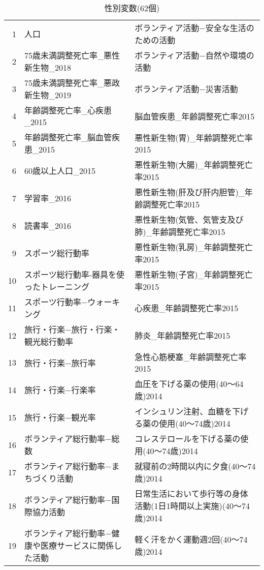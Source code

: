 \begin{table}[ht]
\centering
\caption{性別変数(62個)}
\label{table_mf_d2.tex}
\begingroup\tiny

\begin{adjustbox}{width=1\textwidth}
\begin{tabular}{rll}
  \hline
  \hline
1 & 人口 & ボランティア活動−安全な生活のための活動 \\
  2 & 75歳未満調整死亡率\_悪性新生物\_2018 & ボランティア活動−自然や環境の活動 \\
  3 & 75歳未満調整死亡率\_悪政新生物\_2019 & ボランティア活動−災害活動 \\
  4 & 年齢調整死亡率\_心疾患\_2015 & 脳血管疾患\_年齢調整死亡率2015 \\
  5 & 年齢調整死亡率\_脳血管疾患\_2015 & 悪性新生物(胃)\_年齢調整死亡率2015 \\
  6 & 60歳以上人口\_2015 & 悪性新生物(大腸)\_年齢調整死亡率2015 \\
  7 & 学習率\_2016 & 悪性新生物(肝及び肝内胆管)\_年齢調整死亡率2015 \\
  8 & 読書率\_2016 & 悪性新生物(気管、気管支及び肺)\_年齢調整死亡率2015 \\
  9 & スポーツ総行動率 & 悪性新生物(乳房)\_年齢調整死亡率2015 \\
  10 & スポーツ総行動率-器具を使ったトレーニング & 悪性新生物(子宮)\_年齢調整死亡率2015 \\
  11 & スポーツ行動率−ウォーキング & 心疾患\_年齢調整死亡率2015 \\
  12 & 旅行・行楽−旅行・行楽・観光総行動率 & 肺炎\_年齢調整死亡率2015 \\
  13 & 旅行・行楽−旅行率 & 急性心筋梗塞\_年齢調整死亡率2015 \\
  14 & 旅行・行楽−行楽率 & 血圧を下げる薬の使用(40〜64歳)2014 \\
  15 & 旅行・行楽−観光率 & インシュリン注射、血糖を下げる薬の使用(40〜74歳)2014 \\
  16 & ボランティア総行動率−総数 & コレステロールを下げる薬の使用(40〜74歳)2014 \\
  17 & ボランティア総行動率−まちづくり活動 & 就寝前の2時間以内に夕食(40〜74歳)2014 \\
  18 & ボランティア総行動率−国際協力活動 & 日常生活において歩行等の身体活動(1日1時間以上実施)(40〜74歳)2014 \\
  19 & ボランティア総行動率−健康や医療サービスに関係した活動 & 軽く汗をかく運動週2回(40〜74歳)2014 \\

\end{tabular}
\end{adjustbox}
\end{table}
